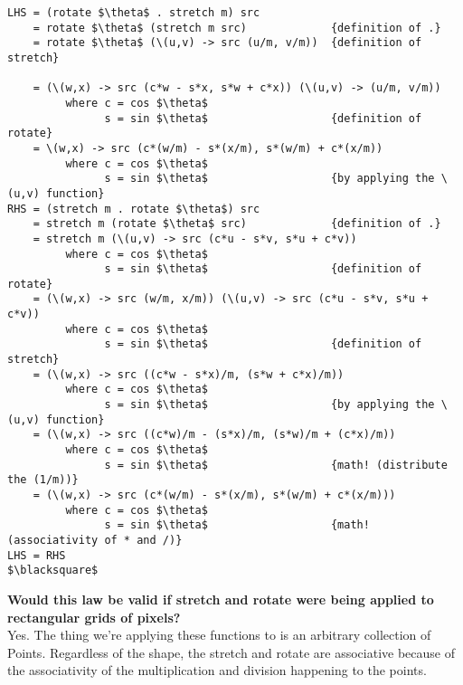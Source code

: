 \documentclass{article}
\begin{document}
\begin{lstlisting}
LHS = (rotate $\theta$ . stretch m) src
    = rotate $\theta$ (stretch m src)             {definition of .}
    = rotate $\theta$ (\(u,v) -> src (u/m, v/m))  {definition of stretch}
    
    = (\(w,x) -> src (c*w - s*x, s*w + c*x)) (\(u,v) -> (u/m, v/m))
         where c = cos $\theta$
               s = sin $\theta$                   {definition of rotate}
    = \(w,x) -> src (c*(w/m) - s*(x/m), s*(w/m) + c*(x/m))
         where c = cos $\theta$
               s = sin $\theta$                   {by applying the \(u,v) function}
RHS = (stretch m . rotate $\theta$) src
    = stretch m (rotate $\theta$ src)             {definition of .}
    = stretch m (\(u,v) -> src (c*u - s*v, s*u + c*v))
         where c = cos $\theta$
               s = sin $\theta$                   {definition of rotate}
    = (\(w,x) -> src (w/m, x/m)) (\(u,v) -> src (c*u - s*v, s*u + c*v))
         where c = cos $\theta$
               s = sin $\theta$                   {definition of stretch}
    = (\(w,x) -> src ((c*w - s*x)/m, (s*w + c*x)/m))
         where c = cos $\theta$
               s = sin $\theta$                   {by applying the \(u,v) function}
    = (\(w,x) -> src ((c*w)/m - (s*x)/m, (s*w)/m + (c*x)/m))
         where c = cos $\theta$
               s = sin $\theta$                   {math! (distribute the (1/m))}
    = (\(w,x) -> src (c*(w/m) - s*(x/m), s*(w/m) + c*(x/m)))
         where c = cos $\theta$
               s = sin $\theta$                   {math! (associativity of * and /)}
LHS = RHS
$\blacksquare$
\end{lstlisting}

\textbf{Would this law be valid if stretch and rotate were being applied to
rectangular grids of pixels?}\\
Yes. The thing we're applying these functions to is an arbitrary collection of 
Points. Regardless of the shape, the stretch and rotate are associative because
of the associativity of the multiplication and division happening to the points.

\pagebreak
\end{document}

